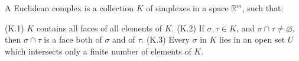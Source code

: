 A Euclidean complex is a collection $K$ of simplexes in a space $\mathbb{R}^m$, such that:

(K.1) $K$ contains all faces of all elements of $K$.
(K.2) If $\sigma, \tau \in K$, and $\sigma \cap \tau \neq \varnothing$, then $\sigma \cap \tau$ is a face both of $\sigma$ and of $\tau$.
(K.3) Every $\sigma$ in $K$ lies in an open set $U$ which intersects only a finite number of elements of $K$.
